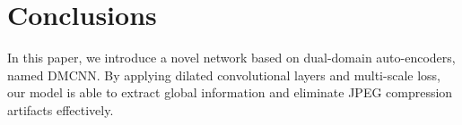 \documentclass{article}
\begin{document}
\vspace{-0.3cm}
\section{Conclusions}
\vspace{-0.3cm}
\label{sec:conc}
In this paper, we introduce a novel network based on dual-domain auto-encoders,
named DMCNN. By applying dilated convolutional layers and multi-scale loss,
our model is able to extract global information and eliminate
JPEG compression artifacts effectively.







\small

\end{document}
